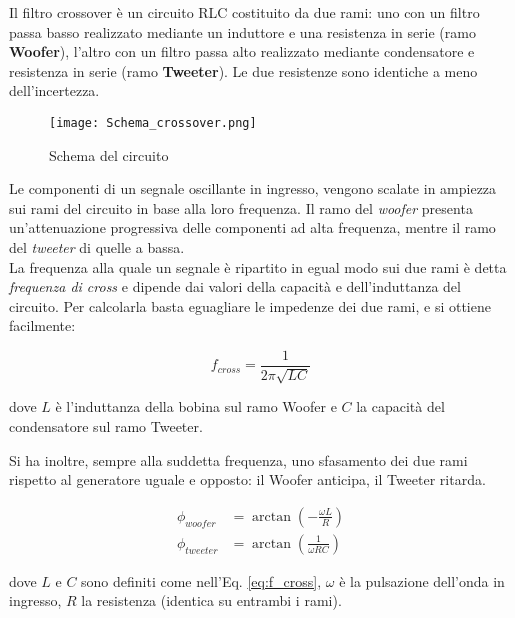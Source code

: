 \documentclass[../Relazione_circuiti]{subfiles}
\begin{document}
Il filtro crossover è un circuito RLC costituito da due rami: uno con un filtro passa basso realizzato mediante un
induttore e una resistenza in serie (ramo \textbf{Woofer}), l'altro con un filtro passa alto realizzato mediante
condensatore e resistenza in serie (ramo \textbf{Tweeter}). Le due resistenze sono identiche a meno dell'incertezza.

\begin{figure}[H]
  \centering
  \texttt{[image: Schema\_crossover.png]}

  \caption{Schema del circuito}
  \label{fig:schema_circuito}

\end{figure}

Le componenti di un segnale oscillante in ingresso, vengono scalate in ampiezza sui rami del circuito in base alla loro
frequenza. Il ramo del \textit{woofer} presenta un'attenuazione progressiva delle componenti ad alta frequenza, mentre il ramo
del \textit{tweeter} di quelle a bassa.\\
La frequenza alla quale un segnale è ripartito in egual modo sui due rami è detta \textit{frequenza di cross} e dipende
dai valori della capacità e dell'induttanza del circuito.
Per calcolarla basta eguagliare le impedenze dei due rami, e si ottiene facilmente:

\begin{equation}
  \label{eq:f_cross}
  f_{cross} = \frac{1}{2 \pi \sqrt{LC} }
\end{equation}

dove $L$ è l'induttanza della bobina sul ramo Woofer e $C$ la capacità del condensatore sul ramo Tweeter.

Si ha inoltre, sempre alla suddetta frequenza, uno sfasamento dei due rami rispetto al generatore uguale e opposto: il
Woofer anticipa, il Tweeter ritarda.

\begin{align}
  \phi_{woofer} &= \arctan(-\frac{\omega L}{R}) \label{eq:p_woofer} \\
  \phi_{tweeter} &= \arctan(\frac{1}{\omega RC}) \label{eq:p_tweeter}
\end{align}

dove $L$ e $C$ sono definiti come nell'Eq. \eqref{eq:f_cross}, $\omega$ è la pulsazione dell'onda in ingresso, $R$ la resistenza
(identica su entrambi i rami).
\end{document}
